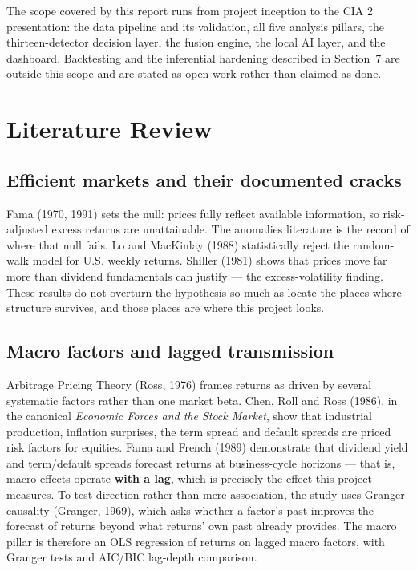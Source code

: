 \documentclass[11pt,a4paper]{article}
\begin{document}
The scope covered by this report runs from project inception to the CIA 2 presentation:
the data pipeline and its validation, all five analysis pillars, the thirteen-detector
decision layer, the fusion engine, the local AI layer, and the dashboard. Backtesting and
the inferential hardening described in Section~7 are outside this scope and are stated as
open work rather than claimed as done.

\section{Literature Review}

\subsection{Efficient markets and their documented cracks}

Fama (1970, 1991) sets the null: prices fully reflect available information, so
risk-adjusted excess returns are unattainable. The anomalies literature is the record of
where that null fails. Lo and MacKinlay (1988) statistically reject the random-walk model
for U.S. weekly returns. Shiller (1981) shows that prices move far more than dividend
fundamentals can justify --- the excess-volatility finding. These results do not overturn
the hypothesis so much as locate the places where structure survives, and those places are
where this project looks.

\subsection{Macro factors and lagged transmission}

Arbitrage Pricing Theory (Ross, 1976) frames returns as driven by several systematic
factors rather than one market beta. Chen, Roll and Ross (1986), in the canonical
\emph{Economic Forces and the Stock Market}, show that industrial production, inflation
surprises, the term spread and default spreads are priced risk factors for equities. Fama
and French (1989) demonstrate that dividend yield and term/default spreads forecast
returns at business-cycle horizons --- that is, macro effects operate \textbf{with a lag},
which is precisely the effect this project measures. To test direction rather than mere
association, the study uses Granger causality (Granger, 1969), which asks whether a
factor's past improves the forecast of returns beyond what returns' own past already
provides. The macro pillar is therefore an OLS regression of returns on lagged macro
factors, with Granger tests and AIC/BIC lag-depth comparison.
\end{document}
